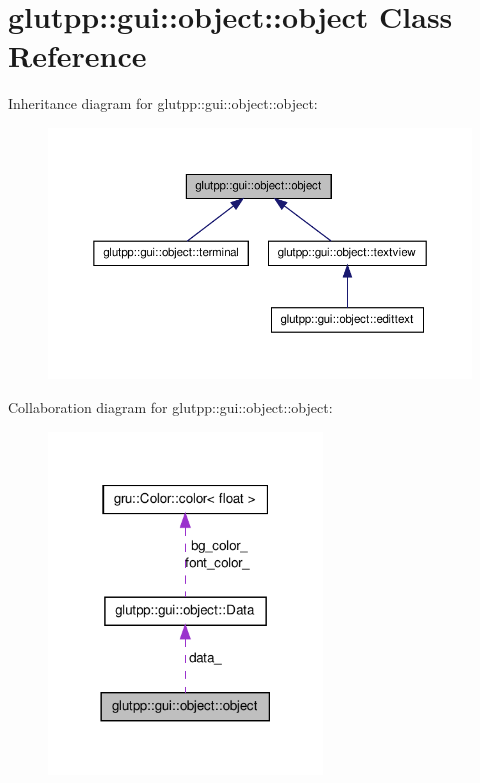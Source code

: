 \hypertarget{classglutpp_1_1gui_1_1object_1_1object}{\section{glutpp\-:\-:gui\-:\-:object\-:\-:object \-Class \-Reference}
\label{classglutpp_1_1gui_1_1object_1_1object}
}


\-Inheritance diagram for glutpp\-:\-:gui\-:\-:object\-:\-:object\-:\nopagebreak
\begin{figure}[H]
\begin{center}
\leavevmode
\includegraphics[width=350pt]{classglutpp_1_1gui_1_1object_1_1object__inherit__graph}
\end{center}
\end{figure}


\-Collaboration diagram for glutpp\-:\-:gui\-:\-:object\-:\-:object\-:
\nopagebreak
\begin{figure}[H]
\begin{center}
\leavevmode
\includegraphics[width=206pt]{classglutpp_1_1gui_1_1object_1_1object__coll__graph}
\end{center}
\end{figure}
